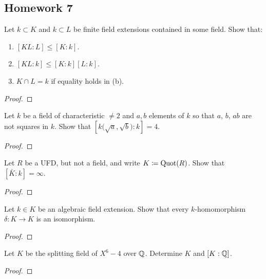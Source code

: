\subsection{Homework 7}
\begin{problem}
  Let $k\subset K$ and $k\subset L$ be finite field extensions contained in
  some field. Show that:
  \begin{enumerate}[label=(\alph*),noitemsep]
  \item $[KL:L]\leq [K:k]$.
  \item $[KL:k]\leq [K:k][L:k]$.
  \item $K\cap L=k$ if equality holds in (b).
  \end{enumerate}
\end{problem}
\begin{proof}
\end{proof}

\begin{problem}
  Let $k$ be a field of characteristic $\neq 2$ and $a,b$ elements of $k$
  so that $a$, $b$, $ab$ are not squares in $k$. Show that
  $\left[k{\bigl(\sqrt{a},\sqrt{b}\bigr)}:k\right]=4$.
\end{problem}
\begin{proof}
\end{proof}

\begin{problem}
  Let $R$ be a UFD, but not a field, and write $K\coloneqq\operatorname{Quot}(R)$. Show
  that $[\bar K:k]=\infty$.
\end{problem}
\begin{proof}
\end{proof}

\begin{problem}
  Let $k\in K$ be an algebraic field extension. Show that every
  $k$-homomorphism $\delta\colon K\to K$ is an isomorphism.
\end{problem}
\begin{proof}
\end{proof}

\begin{problem}
  Let $K$ be the splitting field of $X^6-4$ over $\mathbb{Q}$. Determine $K$ and
  $[K:\mathbb{Q}]$.
\end{problem}
\begin{proof}
\end{proof}

